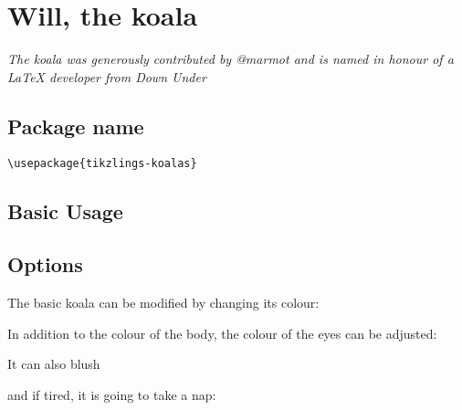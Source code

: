 \documentclass[parskip=half]{scrartcl}
\begin{document}
%
%
\clearpage
\section[Koala]{Will, the koala}

\emph{The koala was generously contributed by @marmot and is named in honour of a \LaTeX{} developer from Down Under}

\subsection{Package name}

\begin{tcolorbox}[lower separated=false, lefthand width=.8\linewidth]
\vspace*{0.5cm}
\lstinline|\usepackage{tikzlings-koalas}| 
\vspace*{0.5cm}
\end{tcolorbox}

\subsection{Basic Usage}

\begin{tcblisting}{}
\koala
\end{tcblisting}

\subsection{Options}

The basic koala can be modified by changing its colour:
\begin{tcblisting}{}
\koala[body=blue]
\end{tcblisting}

In addition to the colour of the body, the colour of the eyes can be adjusted:
\begin{tcblisting}{}
\koala[eye=red]
\end{tcblisting}

It can also blush
\begin{tcblisting}{}
\koala[blush]
\end{tcblisting}

and if tired, it is going to take a nap:
\begin{tcblisting}{}
\koala[sleeping]
\end{tcblisting}
\end{document}
